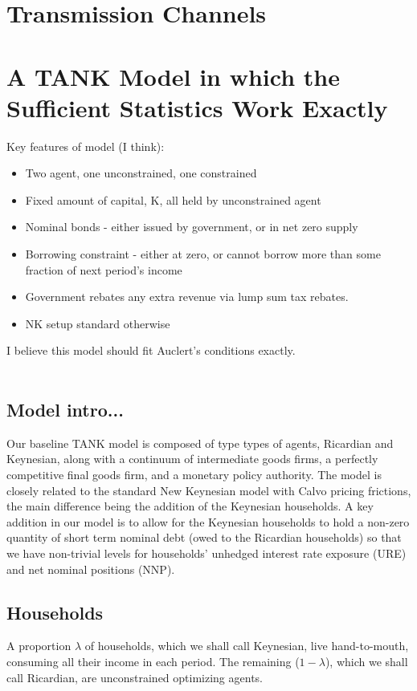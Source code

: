 \documentclass[titlepage]{\econtex}\newcommand{\texname}{ConsumptionHeterogeneity}
\begin{document}
\section{Transmission Channels} \label{transmission_channels}

\section{A TANK Model in which the Sufficient Statistics Work Exactly}
Key features of model (I think):
\begin{itemize}
	\item Two agent, one unconstrained, one constrained
	\item Fixed amount of capital, K, all held by unconstrained agent
	\item Nominal bonds - either issued by government, or in net zero supply
	\item Borrowing constraint - either at zero, or cannot borrow more than some fraction of next period's income
	\item Government rebates any extra revenue via lump sum tax rebates.
	\item NK setup standard otherwise
\end{itemize}
I believe this model should fit Auclert's conditions exactly.\\
\\
\subsection{Model intro...}
Our baseline TANK model is composed of type types of agents, Ricardian and Keynesian, along with a continuum of intermediate goods firms, a perfectly competitive final goods firm, and a monetary policy authority. The model is closely related to the standard New Keynesian model with Calvo pricing frictions, the main difference being the addition of the Keynesian households. A key addition in our model is to allow for the Keynesian households to hold a non-zero quantity of short term nominal debt (owed to the Ricardian households) so that we have non-trivial levels for households' unhedged interest rate exposure (URE) and net nominal positions (NNP).

\subsection{Households}
A proportion $\lambda$ of households, which we shall call Keynesian, live hand-to-mouth, consuming all their income in each period. The remaining ($1-\lambda$), which we shall call Ricardian, are unconstrained optimizing agents.
\end{document}
